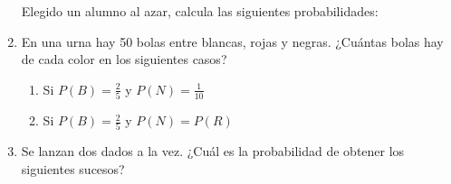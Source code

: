 \documentclass[twoside]{article}
\begin{document}
\begin{enumerate}
Elegido un alumno al azar, calcula las siguientes probabilidades:
\begin{enumerate}
\end{enumerate}
\item En una urna hay 50 bolas entre blancas, rojas y negras. ¿Cuántas bolas hay de cada color en los siguientes casos?
\begin{enumerate}
\item Si $P(B)=\frac{2}{5}$ \quad y \quad $P(N)=\frac{1}{10}$
\item Si $P(B)=\frac{2}{5}$ \quad y \quad $P(N)=P(R)$
\end{enumerate}
\item Se lanzan dos dados a la vez. ¿Cuál es la probabilidad de obtener los siguientes sucesos?
\begin{enumerate}
\end{enumerate}
\end{enumerate}
\end{document}
